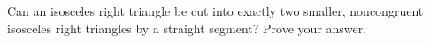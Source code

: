 Can an isosceles right triangle be cut into exactly two smaller, noncongruent isosceles right triangles by a straight segment? Prove your answer.

